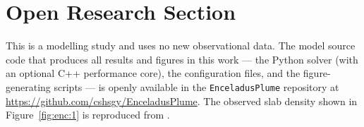 \documentclass[draft]{agujournal2019}
\begin{document}




%
%

\section*{Open Research Section}
This is a modelling study and uses no new observational data. The model source
code that produces all results and figures in this work --- the Python solver
(with an optional C++ performance core), the configuration files, and the
figure-generating scripts --- is openly available in the \texttt{EnceladusPlume}
repository at \url{https://github.com/cshsgy/EnceladusPlume}. The observed slab
density shown in Figure~\ref{fig:enc:1} is reproduced from .
\end{document}
